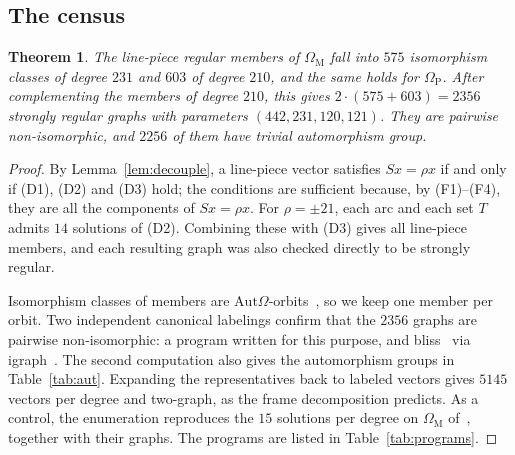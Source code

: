 \documentclass[11pt]{amsart}
\newtheorem{theorem}{Theorem}[section]
\theoremstyle{definition}
\theoremstyle{remark}
\newcommand{\Aut}{\mathrm{Aut}}
\newcommand{\OM}{\Omega_{\mathrm M}}   %
\newcommand{\OP}{\Omega_{\mathrm P}}   %
\begin{document}
\subsection{The census}
\begin{theorem}\label{thm:census}
The line-piece regular members of $\OM$ fall into $575$ isomorphism classes of degree $231$ and $603$ of degree
$210$, and the same holds for $\OP$. After complementing the members of degree $210$, this gives
$2\cdot(575+603)=2356$ strongly regular graphs with parameters $(442,231,120,121)$. They are pairwise
non-isomorphic, and $2256$ of them have trivial automorphism group.
\end{theorem}
\begin{proof}
By Lemma~\ref{lem:decouple}, a line-piece vector satisfies $Sx=\rho x$ if and only if (D1), (D2) and (D3) hold; the conditions are sufficient because, by (F1)--(F4), they
are all the components of $Sx=\rho x$. For $\rho=\pm21$, each arc and each set $T$ admits $14$ solutions of (D2).
Combining these with (D3) gives all line-piece members, and each resulting graph was also checked directly to be
strongly regular.

Isomorphism classes of members are $\Aut\Omega$-orbits~\cite[Lemma~2.4]{Plummer442}, so we keep one member per
orbit. Two independent canonical labelings confirm that the $2356$ graphs are pairwise non-isomorphic: a program
written for this purpose, and bliss~\cite{bliss} via igraph~\cite{igraph}. The second computation also gives the
automorphism groups in Table~\ref{tab:aut}. Expanding the representatives back to labeled vectors gives $5145$
vectors per degree and two-graph, as the frame decomposition predicts. As a control, the enumeration reproduces the
$15$ solutions per degree on $\OM$ of~\cite[Theorem~3.2]{Plummer442}, together with their graphs. The programs are
listed in Table~\ref{tab:programs}.
\end{proof}

\begin{table}[t]
\centering
{\small\setlength{\tabcolsep}{5pt}}
\bigskip
\caption{Automorphism groups of the $2356$ census graphs, by two-graph and degree (members of degree $210$ through
their complements). Each column gives $|\Aut|$ and the orbit lengths on the $442$ vertices. Numbers in brackets count
graphs known before the census: for $\OM$ the $14$ graphs of~\cite{Plummer442}, for $\OP$ $15$ members found earlier
with the same line-piece program ($14$ centered, $1$ rigid). So $29$ of the $2356$ graphs were known before.}
\label{tab:aut}
\end{table}
\end{document}

